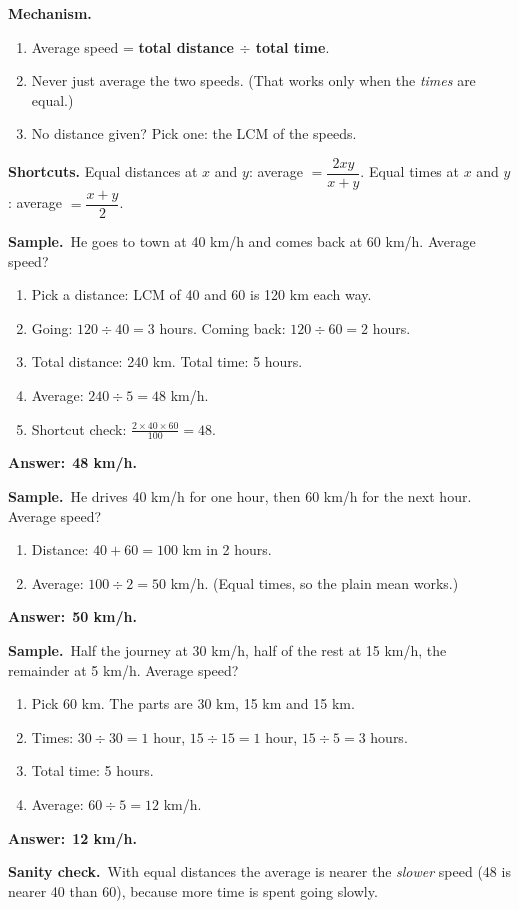 \documentclass[11pt,a4paper]{article}
\newcommand{\mech}{\textbf{\color{ember}Mechanism.}\ }
\newif\ifkeepsamp
\newcommand{\ans}[1]{\par\nopagebreak\noindent\textbf{\color{ember}Answer:}\ \textbf{#1}\par}
\newcommand{\samp}{\ifkeepsamp\needspace{4\baselineskip}\fi\textbf{\color{ember}Sample.}\ }
\newcommand{\sane}{\textbf{\color{slate}Sanity check.}\ }
\begin{document}
\mech
\begin{enumerate}
\item Average speed = \textbf{total distance $\div$ total time}.
\item Never just average the two speeds. (That works only when the \emph{times} are equal.)
\item No distance given? Pick one: the LCM of the speeds.
\end{enumerate}
\textbf{Shortcuts.} Equal distances at $x$ and $y$: average $=\dfrac{2xy}{x+y}$. Equal times at $x$ and $y$: average $=\dfrac{x+y}{2}$.

\samp He goes to town at 40 km/h and comes back at 60 km/h. Average speed?
\begin{enumerate}
\item Pick a distance: LCM of 40 and 60 is 120 km each way.
\item Going: $120 \div 40 = 3$ hours. Coming back: $120 \div 60 = 2$ hours.
\item Total distance: 240 km. Total time: 5 hours.
\item Average: $240 \div 5 = 48$ km/h.
\item Shortcut check: $\tfrac{2 \times 40 \times 60}{100} = 48$.
\end{enumerate}
\ans{48 km/h.}

\samp He drives 40 km/h for one hour, then 60 km/h for the next hour. Average speed?
\begin{enumerate}
\item Distance: $40 + 60 = 100$ km in 2 hours.
\item Average: $100 \div 2 = 50$ km/h. (Equal times, so the plain mean works.)
\end{enumerate}
\ans{50 km/h.}

\samp Half the journey at 30 km/h, half of the rest at 15 km/h, the remainder at 5 km/h. Average speed?
\begin{enumerate}
\item Pick 60 km. The parts are 30 km, 15 km and 15 km.
\item Times: $30 \div 30 = 1$ hour, $15 \div 15 = 1$ hour, $15 \div 5 = 3$ hours.
\item Total time: 5 hours.
\item Average: $60 \div 5 = 12$ km/h.
\end{enumerate}
\ans{12 km/h.}

\sane With equal distances the average is nearer the \emph{slower} speed (48 is nearer 40 than 60), because more time is spent going slowly.
\end{document}
